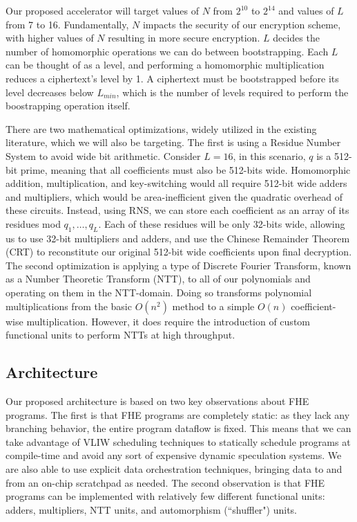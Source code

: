 Our proposed accelerator will target values of $N$ from $2^10$ to $2^14$ and
values of $L$ from 7 to 16. Fundamentally, $N$ impacts the security of our
encryption scheme, with higher values of $N$ resulting in more secure
encryption. $L$ decides the number of homomorphic operations we can do between
bootstrapping. Each $L$ can be thought of as a level, and performing a
homomorphic multiplication reduces a ciphertext's level by 1. A ciphertext must
be bootstrapped before its level decreases below $L_{min}$, which is the 
number of levels required to perform the boostrapping operation itself.

There are two mathematical optimizations, widely utilized in the existing
literature, which we will also be targeting. The first is using a 
Residue Number System to avoid wide bit arithmetic. Consider $L = 16$, in
this scenario, $q$ is a 512-bit prime, meaning that all coefficients must
also be 512-bits wide. Homomorphic addition, multiplication, and key-switching
would all require 512-bit wide adders and multipliers, which would be
area-inefficient given the quadratic overhead of these circuits.
Instead, using RNS, we can store each coefficient as an array of its residues
mod $q_1, \dots, q_L$. Each of these residues will be only 32-bits wide,
allowing us to use 32-bit multipliers and adders, and use the
Chinese Remainder Theorem (CRT) to reconstitute our original 512-bit wide
coefficients upon final decryption. The second optimization is applying a
type of Discrete Fourier Transform, known as a Number Theoretic Transform (NTT),
to all of our polynomials and operating on them in the NTT-domain. Doing so
transforms polynomial multiplications from the basic $O(n^2)$ method to a simple
$O(n)$ coefficient-wise multiplication. However, it does require the
introduction of custom functional units to perform NTTs at high
throughput.

\subsection{Architecture}

Our proposed architecture is based on two key observations about FHE programs.
The first is that FHE programs are completely static: as they lack any
branching behavior, the entire program dataflow is fixed. This means
that we can take advantage of VLIW scheduling techniques to statically
schedule programs at compile-time and avoid any sort of expensive dynamic
speculation systems. 
We are also able to use explicit data orchestration techniques, bringing
data to and from an on-chip scratchpad as needed.
The second observation is that FHE programs can be
implemented with relatively few different functional units: adders,
multipliers, NTT units, and automorphism (``shuffler") units.


